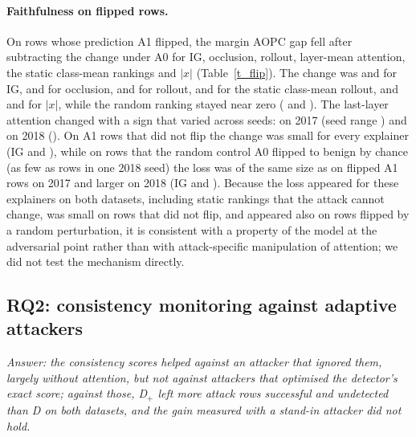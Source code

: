 \paragraph{Faithfulness on flipped rows.}
On rows whose prediction A1 flipped, the margin AOPC gap fell after subtracting the change under A0 for IG, occlusion,
rollout, layer-mean attention, the static class-mean rankings and $|x|$ (Table~\ref{t_flip}).
The change was \flipIGVoneSeventeen{} and \flipIGVoneEighteen{} for IG, \flipOcclVoneSeventeen{} and
\flipOcclVoneEighteen{} for occlusion, \flipRolloutVoneSeventeen{} and \flipRolloutVoneEighteen{} for rollout,
\flipStaticRolloutVoneSeventeen{} and \flipStaticRolloutVoneEighteen{} for the static class-mean rollout, and
\flipAbsXVoneSeventeen{} and \flipAbsXVoneEighteen{} for $|x|$, while the random ranking stayed near zero
(\flipRandomVoneSeventeen{} and \flipRandomVoneEighteen).
The last-layer attention changed with a sign that varied across seeds: \flipLastVoneSeventeen{} on 2017 (seed range
\flipLastVoneSeventeenRange) and \flipLastVoneEighteen{} on 2018 (\flipLastVoneEighteenRange).
On A1 rows that did not flip the change was small for every explainer (IG \notflipIGVoneSeventeen{} and
\notflipIGVoneEighteen), while on rows that the random control A0 flipped to benign by chance (as few as
\nAzeroFlipVoneEighteenMin{} rows in one 2018 seed) the loss was of the same size as on flipped A1 rows on 2017 and
larger on 2018 (IG \azeroflipIGVoneSeventeen{} and \azeroflipIGVoneEighteen).
Because the loss appeared for these explainers on both datasets, including static rankings that the attack cannot
change, was small on rows that did not flip, and appeared also on rows flipped by a random perturbation, it is
consistent with a property of the model at the adversarial point rather than with attack-specific manipulation of
attention; we did not test the mechanism directly.



\subsection{RQ2: consistency monitoring against adaptive attackers}
\label{sec:rq2}
\emph{Answer: the consistency scores helped against an attacker that ignored them, largely without attention, but not
against attackers that optimised the detector's exact score; against those, D$_+$ left more attack rows successful and
undetected than D on both datasets, and the gain measured with a stand-in attacker did not hold.}

